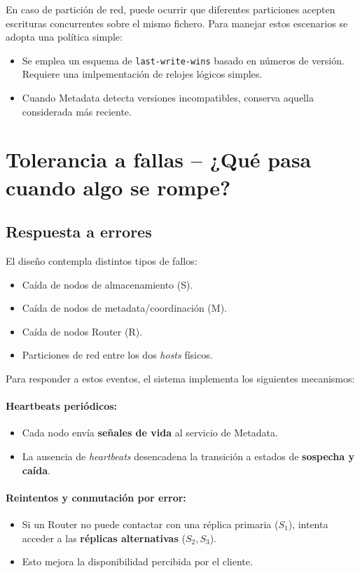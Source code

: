 \documentclass{article}
\begin{document}
En caso de partición de red, puede ocurrir que diferentes particiones acepten escrituras concurrentes sobre el mismo fichero. Para manejar estos escenarios se adopta una política simple:
\begin{itemize}
    \item Se emplea un esquema de \texttt{last-write-wins} basado en números de versión. Requiere una imlpementación de relojes lógicos simples.
    \item Cuando Metadata detecta versiones incompatibles, conserva aquella considerada más reciente.
\end{itemize}

\section{Tolerancia a fallas – ¿Qué pasa cuando algo se rompe?}

\subsection{Respuesta a errores}
El diseño contempla distintos tipos de fallos:
\begin{itemize}
    \item Caída de nodos de almacenamiento (S).
    \item Caída de nodos de metadata/coordinación (M).
    \item Caída de nodos Router (R).
    \item Particiones de red entre los dos \emph{hosts} físicos.
\end{itemize}

Para responder a estos eventos, el sistema implementa los siguientes mecanismos:

\paragraph{Heartbeats periódicos:}
\begin{itemize}
    \item Cada nodo envía \textbf{señales de vida} al servicio de Metadata.
    \item La ausencia de \emph{heartbeats} desencadena la transición a estados de \textbf{sospecha y caída}.
\end{itemize}

\paragraph{Reintentos y conmutación por error:}
\begin{itemize}
    \item Si un Router no puede contactar con una réplica primaria ($S_1$), intenta acceder a las \textbf{réplicas alternativas} ($S_2, S_3$).
    \item Esto mejora la disponibilidad percibida por el cliente.
\end{itemize}
\end{document}

